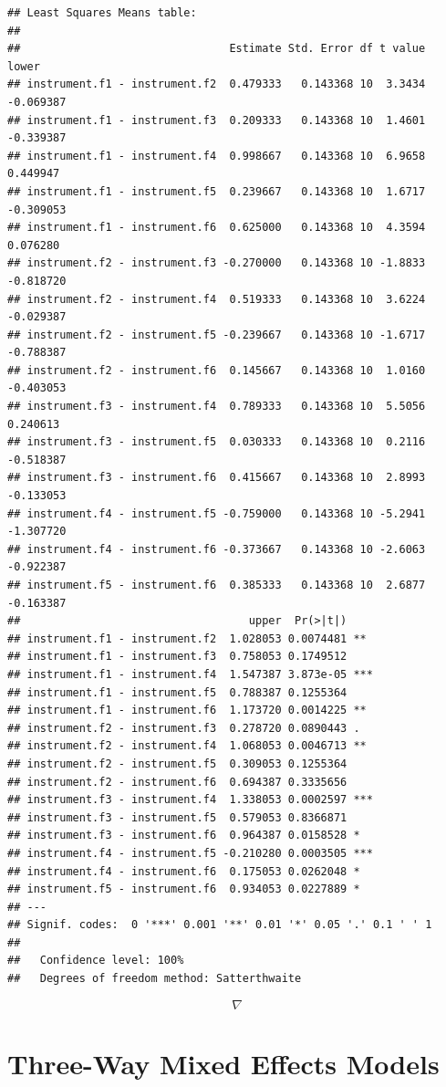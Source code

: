 \documentclass[
]{book}
\begin{document}
\begin{verbatim}
## Least Squares Means table:
## 
##                                Estimate Std. Error df t value     lower
## instrument.f1 - instrument.f2  0.479333   0.143368 10  3.3434 -0.069387
## instrument.f1 - instrument.f3  0.209333   0.143368 10  1.4601 -0.339387
## instrument.f1 - instrument.f4  0.998667   0.143368 10  6.9658  0.449947
## instrument.f1 - instrument.f5  0.239667   0.143368 10  1.6717 -0.309053
## instrument.f1 - instrument.f6  0.625000   0.143368 10  4.3594  0.076280
## instrument.f2 - instrument.f3 -0.270000   0.143368 10 -1.8833 -0.818720
## instrument.f2 - instrument.f4  0.519333   0.143368 10  3.6224 -0.029387
## instrument.f2 - instrument.f5 -0.239667   0.143368 10 -1.6717 -0.788387
## instrument.f2 - instrument.f6  0.145667   0.143368 10  1.0160 -0.403053
## instrument.f3 - instrument.f4  0.789333   0.143368 10  5.5056  0.240613
## instrument.f3 - instrument.f5  0.030333   0.143368 10  0.2116 -0.518387
## instrument.f3 - instrument.f6  0.415667   0.143368 10  2.8993 -0.133053
## instrument.f4 - instrument.f5 -0.759000   0.143368 10 -5.2941 -1.307720
## instrument.f4 - instrument.f6 -0.373667   0.143368 10 -2.6063 -0.922387
## instrument.f5 - instrument.f6  0.385333   0.143368 10  2.6877 -0.163387
##                                   upper  Pr(>|t|)    
## instrument.f1 - instrument.f2  1.028053 0.0074481 ** 
## instrument.f1 - instrument.f3  0.758053 0.1749512    
## instrument.f1 - instrument.f4  1.547387 3.873e-05 ***
## instrument.f1 - instrument.f5  0.788387 0.1255364    
## instrument.f1 - instrument.f6  1.173720 0.0014225 ** 
## instrument.f2 - instrument.f3  0.278720 0.0890443 .  
## instrument.f2 - instrument.f4  1.068053 0.0046713 ** 
## instrument.f2 - instrument.f5  0.309053 0.1255364    
## instrument.f2 - instrument.f6  0.694387 0.3335656    
## instrument.f3 - instrument.f4  1.338053 0.0002597 ***
## instrument.f3 - instrument.f5  0.579053 0.8366871    
## instrument.f3 - instrument.f6  0.964387 0.0158528 *  
## instrument.f4 - instrument.f5 -0.210280 0.0003505 ***
## instrument.f4 - instrument.f6  0.175053 0.0262048 *  
## instrument.f5 - instrument.f6  0.934053 0.0227889 *  
## ---
## Signif. codes:  0 '***' 0.001 '**' 0.01 '*' 0.05 '.' 0.1 ' ' 1
## 
##   Confidence level: 100%
##   Degrees of freedom method: Satterthwaite
\end{verbatim}

\[ \nabla \]

\section{Three-Way Mixed Effects
Models}\label{three-way-mixed-effects-models}
\end{document}
